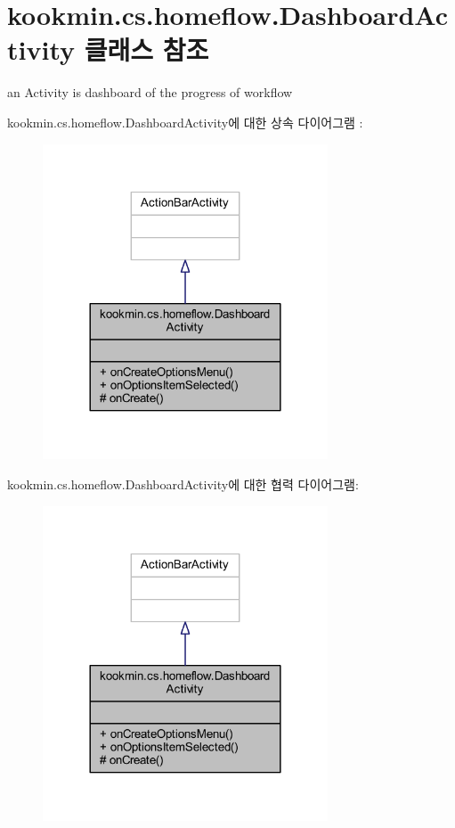 \hypertarget{classkookmin_1_1cs_1_1homeflow_1_1_dashboard_activity}{}\section{kookmin.\+cs.\+homeflow.\+Dashboard\+Activity 클래스 참조}
\label{classkookmin_1_1cs_1_1homeflow_1_1_dashboard_activity}


an Activity is dashboard of the progress of workflow  




kookmin.\+cs.\+homeflow.\+Dashboard\+Activity에 대한 상속 다이어그램 \+: \nopagebreak
\begin{figure}[H]
\begin{center}
\leavevmode
\includegraphics[width=240pt]{classkookmin_1_1cs_1_1homeflow_1_1_dashboard_activity__inherit__graph}
\end{center}
\end{figure}


kookmin.\+cs.\+homeflow.\+Dashboard\+Activity에 대한 협력 다이어그램\+:\nopagebreak
\begin{figure}[H]
\begin{center}
\leavevmode
\includegraphics[width=240pt]{classkookmin_1_1cs_1_1homeflow_1_1_dashboard_activity__coll__graph}
\end{center}
\end{figure}
